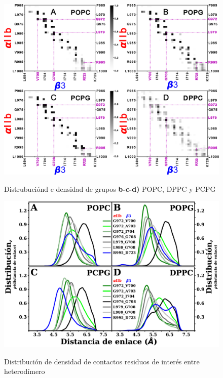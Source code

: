 \begin{figure}[H]
 \centering
	\includegraphics[width=1\linewidth, height=0.8\textheight, keepaspectratio]{fig/02_dm/contact_map2.pdf}
	\caption{Distrubuciónd e densidad de grupos  \textbf{b-c-d)} POPC, DPPC y PCPG}
    	\label{fig:headmap}
\end{figure}




\begin{figure}[H]
    \centering
	\includegraphics[width=1\linewidth, height=0.99\textheight, keepaspectratio]{fig/02_dm/distance_contacts_all.pdf} 
	\caption{Distribución de densidad de contactos residuos de interés entre heterodímero}
    \label{fig:contac}
\end{figure}


